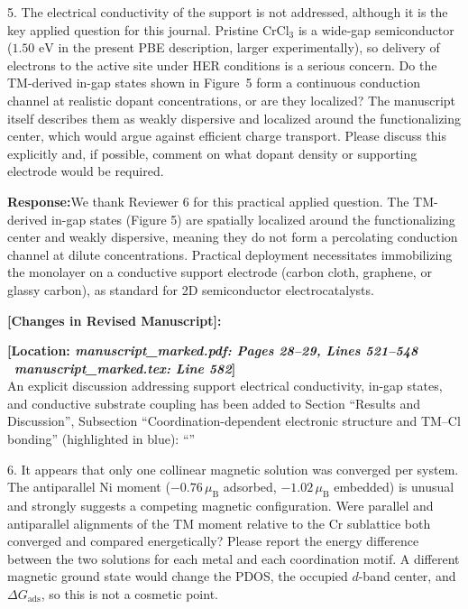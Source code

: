 \documentclass[11pt, sans, a4paper]{moderncv}
\newcommand{\response}{\vspace{0.4em}\noindent\textbf{\color{actionblue}Response:}\hspace{0.5em}}
\newcommand{\manuscriptchange}[1]{{\renewcommand{\label}[1]{}\vspace{0.4em}\noindent\textbf{\color{acsblue}[Changes in Revised Manuscript]:}\par\nopagebreak\vspace{0.15em}#1\vspace{0.4em}}}
\begin{document}
\begin{reviewercomment}
5. The electrical conductivity of the support is not addressed, although it is the key applied question for this journal. Pristine $\text{CrCl}_3$ is a wide-gap semiconductor ($1.50\text{ eV}$ in the present PBE description, larger experimentally), so delivery of electrons to the active site under HER conditions is a serious concern. Do the TM-derived in-gap states shown in Figure~5 form a continuous conduction channel at realistic dopant concentrations, or are they localized? The manuscript itself describes them as weakly dispersive and localized around the functionalizing center, which would argue against efficient charge transport. Please discuss this explicitly and, if possible, comment on what dopant density or supporting electrode would be required.
\end{reviewercomment}

\response We thank Reviewer 6 for this practical applied question. The TM-derived in-gap states (Figure 5) are spatially localized around the functionalizing center and weakly dispersive, meaning they do not form a percolating conduction channel at dilute concentrations. Practical deployment necessitates immobilizing the monolayer on a conductive support electrode (carbon cloth, graphene, or glassy carbon), as standard for 2D semiconductor electrocatalysts.

\manuscriptchange{\textbf{[Location: \textit{manuscript\_marked.pdf: Pages 28--29, Lines 521--548} \textbar\ \textit{manuscript\_marked.tex: Line 582}]}\\ An explicit discussion addressing support electrical conductivity, in-gap states, and conductive substrate coupling has been added to Section ``Results and Discussion'', Subsection ``Coordination-dependent electronic structure and TM--Cl bonding'' (highlighted in blue): ``{\itshape \ExecuteMetaData[manuscript_marked.tex]{ConductivityBandGap}}''}

\vspace{0.8em}

\begin{reviewercomment}
6. It appears that only one collinear magnetic solution was converged per system. The antiparallel Ni moment ($-0.76\,\mu_{\mathrm{B}}$ adsorbed, $-1.02\,\mu_{\mathrm{B}}$ embedded) is unusual and strongly suggests a competing magnetic configuration. Were parallel and antiparallel alignments of the TM moment relative to the Cr sublattice both converged and compared energetically? Please report the energy difference between the two solutions for each metal and each coordination motif. A different magnetic ground state would change the PDOS, the occupied $d$-band center, and $\Delta G_{\mathrm{ads}}$, so this is not a cosmetic point.
\end{reviewercomment}
\end{document}
